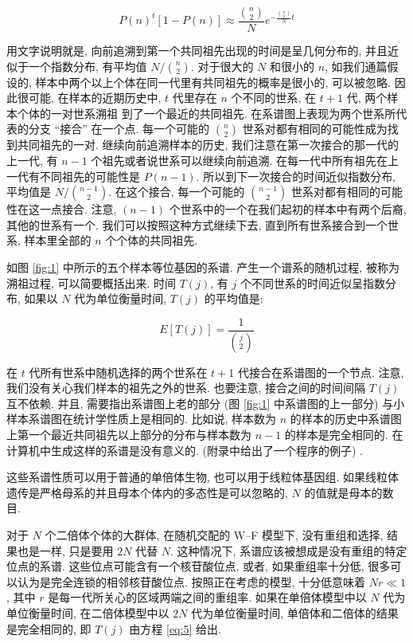 \documentclass[12pt]{article}
\begin{document}
\begin{equation} \label{eq:4}
    P(n)^{t}[1-P(n)] \approx \frac{\binom{n}{2}}{N} e^{-\frac{\binom{n}{2}}{N}t}
\end{equation}

用文字说明就是, 向前追溯到第一个共同祖先出现的时间是呈几何分布的, 并且近似于一个指数分布, 有平均值
$N/\binom{n}{2}$. 对于很大的 $N$ 和很小的 $n$, 如我们通篇假设的,
样本中两个以上个体在同一代里有共同祖先的概率是很小的, 可以被忽略. 因此很可能, 在样本的近期历史中, $t$
代里存在 $n$ 个不同的世系, 在 $t+1$ 代, 两个样本个体的一对世系溯祖 到了一个最近的共同祖先.
在系谱图上表现为两个世系所代表的分支 ``接合'' 在一个点. 每一个可能的 $\binom{n}{2}$
世系对都有相同的可能性成为找到共同祖先的一对. 继续向前追溯样本的历史, 我们注意在第一次接合的那一代的上一代, 有
$n-1$ 个祖先或者说世系可以继续向前追溯. 在每一代中所有祖先在上一代有不同祖先的可能性是 $P(n-1)$.
所以到下一次接合的时间近似指数分布, 平均值是 $N/\binom{n-1}{2}$. 在这个接合, 每一个可能的
$\binom{n-1}{2}$ 世系对都有相同的可能性在这一点接合. 注意, $(n-1)$
个世系中的一个在我们起初的样本中有两个后裔, 其他的世系有一个. 我们可以按照这种方式继续下去,
直到所有世系接合到一个世系, 样本里全部的 $n$ 个个体的共同祖先.

如图 \ref{fig:1} 中所示的五个样本等位基因的系谱. 产生一个谱系的随机过程, 被称为溯祖过程,
可以简要概括出来. 时间 $T(j)$, 有 $j$ 个不同世系的时间近似呈指数分布, 如果以 $N$
代为单位衡量时间, $T(j)$ 的平均值是:

\begin{equation} \label{eq:5}
    E[T(j)]=\frac{1}{\binom{j}{2}}
\end{equation}

在 $t$ 代所有世系中随机选择的两个世系在 $t+1$ 代接合在系谱图的一个节点. 注意, 我们没有关心我们样本的祖先之外的世系.
也要注意, 接合之间的时间间隔 $T(j)$ 互不依赖. 并且, 需要指出系谱图上老的部分 (图 \ref{fig:1} 中系谱图的上一部分)
与小样本系谱图在统计学性质上是相同的. 比如说, 样本数为 $n$
的样本的历史中系谱图上第一个最近共同祖先以上部分的分布与样本数为 $n-1$ 的样本是完全相同的.
在计算机中生成这样的系谱是没有意义的. (附录中给出了一个程序的例子) .

这些系谱性质可以用于普通的单倍体生物, 也可以用于线粒体基因组. 如果线粒体遗传是严格母系的并且母本个体内的多态性是可以忽略的,
$N$ 的值就是母本的数目.

对于 $N$ 个二倍体个体的大群体, 在随机交配的 W--F 模型下, 没有重组和选择, 结果也是一样, 只是要用 $2N$ 代替 $N$.
这种情况下, 系谱应该被想成是没有重组的特定位点的系谱. 这些位点可能含有一个核苷酸位点, 或者, 如果重组率十分低,
很多可以认为是完全连锁的相邻核苷酸位点. 按照正在考虑的模型, 十分低意味着 $Nr\ll 1$, 其中 $r$
是每一代所关心的区域两端之间的重组率. 如果在单倍体模型中以 $N$ 代为单位衡量时间, 在二倍体模型中以 $2N$ 代为单位衡量时间,
单倍体和二倍体的结果是完全相同的, 即 $T(j)$ 由方程 \ref{eq:5} 给出.
\end{document}

